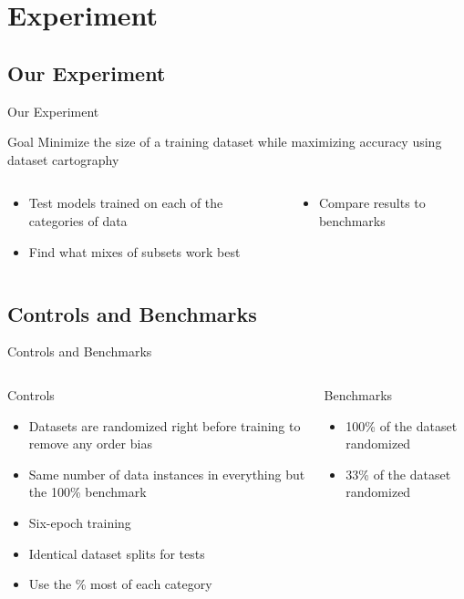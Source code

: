 \documentclass[
	11pt,
]{beamer}
\begin{document}
\section{Experiment}

\subsection{Our Experiment}
\begin{frame}[t]{Our Experiment}
	\begin{block}{Goal}
		Minimize the size of a training dataset while maximizing accuracy using dataset cartography
	\end{block}
	\begin{columns}[t]
		\begin{column}{.5\textwidth}
			\begin{itemize}
				\item Test models trained on each of the categories of data
				\item Find what mixes of subsets work best
			\end{itemize}
		\end{column}
		\begin{column}{.5\textwidth}
			\begin{itemize}
				\item Compare results to benchmarks
			\end{itemize}
		\end{column}
	\end{columns}
\end{frame}


\subsection{Controls and Benchmarks}
\begin{frame}[t]{Controls and Benchmarks}
	\begin{columns}[t]
		\begin{column}{.5\textwidth}
			Controls
			\begin{itemize}
				\item Datasets are randomized right before training to remove any order bias
				\item Same number of data instances in everything but the 100\% benchmark
				\item Six-epoch training
				\item Identical dataset splits for tests
				\item Use the \% most of each category
			\end{itemize}
		\end{column}
		\begin{column}{.5\textwidth}
			Benchmarks
			\begin{itemize}
				\item 100\% of the dataset randomized
				\item 33\% of the dataset randomized
			\end{itemize}
		\end{column}
	\end{columns}
\end{frame}
\end{document}
